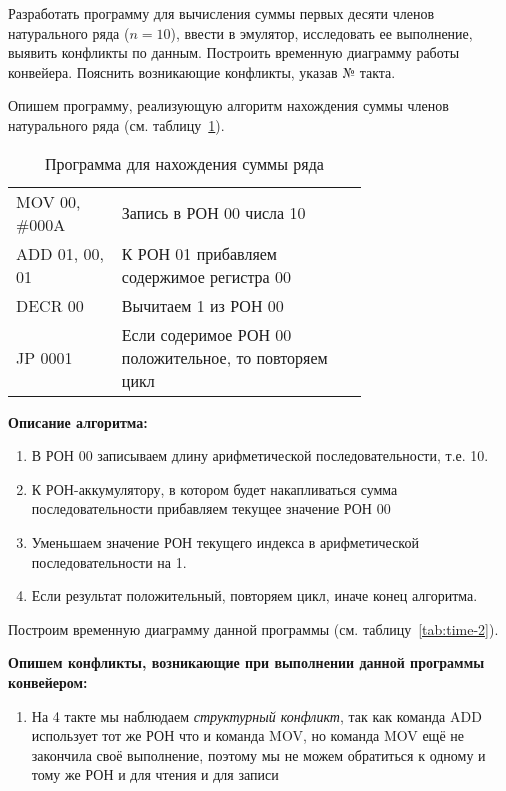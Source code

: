 \documentclass[a4paper,14pt]{extarticle}
\begin{document}
\begin{problem}
	Разработать программу для вычисления суммы первых десяти членов натурального ряда ($n=10$),
	ввести в эмулятор, исследовать ее выполнение, выявить конфликты по
	данным. Построить временную диаграмму работы конвейера. Пояснить
	возникающие конфликты, указав № такта.

	\nonum Опишем программу, реализующую алгоритм нахождения суммы членов натурального ряда (см. таблицу~\ref{tab:prog-2}).
	\newpage
	\begin{table}[htbp]

		\begin{tabular}{|l|p{0.7\linewidth}|}
			\hline
			\centerboldcell{Команда} & \centerboldcell{Описание} \\ \hline\hline
			MOV 00, \#000A & Запись в РОН 00 числа 10 \\ \hline
			ADD 01, 00, 01 & К РОН 01 прибавляем содержимое регистра 00 \\ \hline
			DECR 00 & Вычитаем 1 из РОН 00 \\ \hline
			JP 0001 & Если содеримое РОН 00 положительное, то повторяем цикл \\ \hline
		\end{tabular}
		\caption{Программа для нахождения суммы ряда}
		\label{tab:prog-2}
	\end{table}


\textbf{Описание алгоритма:}
\begin{enumerate}
	\item В РОН 00 записываем длину арифметической последовательности, т.е. 10.
	\item К РОН-аккумулятору, в котором будет накапливаться сумма последовательности прибавляем текущее значение РОН 00
	\item Уменьшаем значение РОН текущего индекса в арифметической последовательности на 1.
	\item Если результат положительный, повторяем цикл, иначе конец алгоритма.
\end{enumerate}

Построим временную диаграмму данной программы (см. таблицу~\ref{tab:time-2}).

\textbf{Опишем конфликты, возникающие при выполнении данной программы конвейером:}
\begin{enumerate}
	\item На 4 такте мы наблюдаем \textit{структурный конфликт}, так как команда ADD использует тот же РОН что и команда MOV, но команда MOV ещё не закончила своё выполнение, поэтому мы  не можем обратиться к одному и тому же РОН и для чтения и для записи
	


\end{enumerate}
\end{problem}
\end{document}
